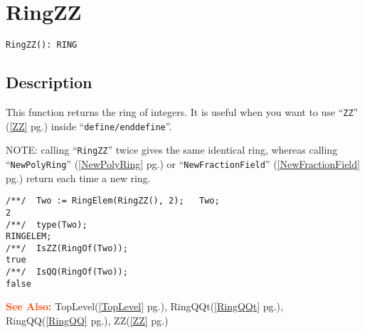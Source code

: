 \documentclass[a4paper]{mybook}
\newenvironment{command}{}{} %
\newcommand\SeeAlso{\par\textcolor{OrangeRed}{\textbf{\large See Also: }}}
\begin{document}
\section{RingZZ}
\label{RingZZ}
\begin{command} %


\begin{Verbatim}[label=syntax, rulecolor=\color{MidnightBlue},
frame=single]
RingZZ(): RING
\end{Verbatim}


\subsection*{Description}

This function returns the ring of integers.
It is useful when you want to use ``\verb&ZZ&'' (\ref{ZZ} pg.\pageref{ZZ}) inside ``\verb&define/enddefine&''.
\par 
NOTE: calling ``\verb&RingZZ&'' twice gives the same identical ring,
whereas calling ``\verb&NewPolyRing&'' (\ref{NewPolyRing} pg.\pageref{NewPolyRing}) or ``\verb&NewFractionField&'' (\ref{NewFractionField} pg.\pageref{NewFractionField})
return each time a new ring.
\begin{Verbatim}[label=example, rulecolor=\color{PineGreen}, frame=single]
/**/  Two := RingElem(RingZZ(), 2);   Two;
2
/**/  type(Two);
RINGELEM;
/**/  IsZZ(RingOf(Two));
true
/**/  IsQQ(RingOf(Two));
false
\end{Verbatim}


\SeeAlso %
  TopLevel(\ref{TopLevel} pg.\pageref{TopLevel}), 
    RingQQt(\ref{RingQQt} pg.\pageref{RingQQt}), 
    RingQQ(\ref{RingQQ} pg.\pageref{RingQQ}), 
    ZZ(\ref{ZZ} pg.\pageref{ZZ})
\end{command} %
\end{document}
